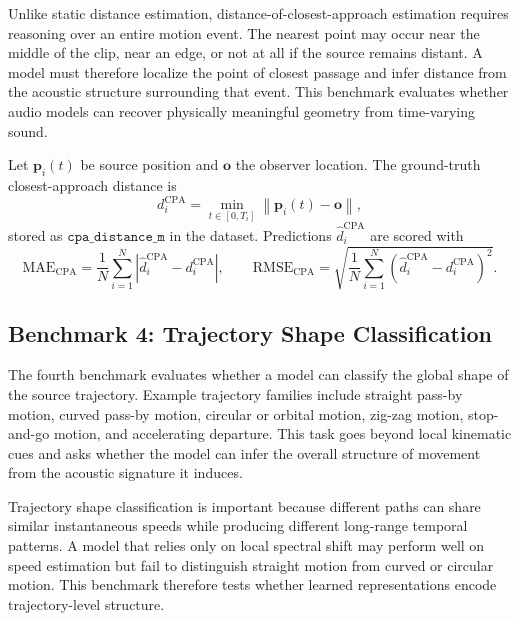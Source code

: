 \documentclass{article}
\begin{document}
Unlike static distance estimation, distance-of-closest-approach estimation requires reasoning over an entire motion event. The nearest point may occur near the middle of the clip, near an edge, or not at all if the source remains distant. A model must therefore localize the point of closest passage and infer distance from the acoustic structure surrounding that event. This benchmark evaluates whether audio models can recover physically meaningful geometry from time-varying sound.

Let \(\mathbf{p}_i(t)\) be source position and \(\mathbf{o}\) the observer location. The ground-truth closest-approach distance is
\begin{equation}
  d_i^{\mathrm{CPA}}=\min_{t\in[0,T_i]}\left\|\mathbf{p}_i(t)-\mathbf{o}\right\|,
\end{equation}
stored as \(\texttt{cpa\_distance\_m}\) in the dataset. Predictions \(\hat d_i^{\mathrm{CPA}}\) are scored with
\begin{equation}
  \mathrm{MAE}_{\mathrm{CPA}}=\frac{1}{N}\sum_{i=1}^{N}\left|\hat d_i^{\mathrm{CPA}}-d_i^{\mathrm{CPA}}\right|,
  \qquad
  \mathrm{RMSE}_{\mathrm{CPA}}=\sqrt{\frac{1}{N}\sum_{i=1}^{N}\left(\hat d_i^{\mathrm{CPA}}-d_i^{\mathrm{CPA}}\right)^2}.
\end{equation}

\subsection{Benchmark 4: Trajectory Shape Classification}

The fourth benchmark evaluates whether a model can classify the global shape of the source trajectory. Example trajectory families include straight pass-by motion, curved pass-by motion, circular or orbital motion, zig-zag motion, stop-and-go motion, and accelerating departure. This task goes beyond local kinematic cues and asks whether the model can infer the overall structure of movement from the acoustic signature it induces.

Trajectory shape classification is important because different paths can share similar instantaneous speeds while producing different long-range temporal patterns. A model that relies only on local spectral shift may perform well on speed estimation but fail to distinguish straight motion from curved or circular motion. This benchmark therefore tests whether learned representations encode trajectory-level structure.
\end{document}
